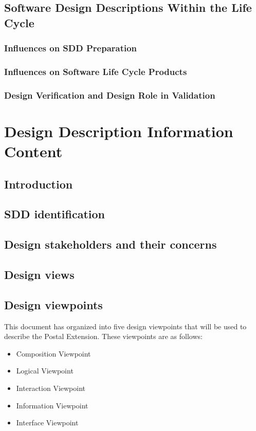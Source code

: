 \documentclass[letterpaper,10pt,titlepage,draftclsnofoot,onecolumn,onesided] {IEEEtran}
\begin{document}
\subsection{Software Design Descriptions Within the Life Cycle}
\subsubsection{Influences on SDD Preparation}
\subsubsection{Influences on Software Life Cycle Products}
\subsubsection{Design Verification and Design Role in Validation}

\section{Design Description Information Content}

\subsection{Introduction}

\subsection{SDD identification}

\subsection{Design stakeholders and their concerns}

\subsection{Design views}

\subsection{Design viewpoints}
This document has organized into five design viewpoints that will be used to describe the Postal Extension.
These viewpoints are as follows:
\begin {itemize}
\item Composition Viewpoint
\item Logical Viewpoint
\item Interaction Viewpoint
\item Information Viewpoint
\item Interface Viewpoint

\end {itemize}
\end{document}

